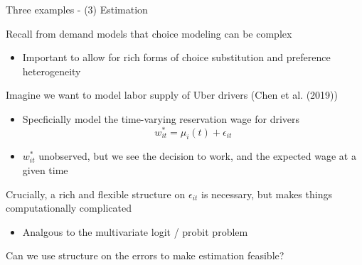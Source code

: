 \documentclass[notes,11pt, aspectratio=169]{beamer}
\newenvironment{wideitemize}{\itemize\addtolength{\itemsep}{10pt}}{\enditemize}
\begin{document}
\begin{frame}{Three examples - (3) Estimation}
  \begin{wideitemize}
  \item Recall from demand models that choice modeling can be complex
    \begin{itemize}
    \item Important to allow for rich forms of choice substitution and
      preference heterogeneity
    \end{itemize}
  \item Imagine we want to model labor supply of Uber drivers (Chen et al. (2019))
    \begin{itemize}
    \item Specficially model the time-varying reservation wage for drivers
      $$w_{it}^{*} = \mu_{i}(t) + \epsilon_{it}$$
    \item $w_{it}^{*}$ unobserved, but we see the decision to work,
      and the expected wage at a given time
    \end{itemize}
  \item Crucially, a rich and flexible structure on $\epsilon_{it}$ is necessary, but makes things computationally complicated
    \begin{itemize}
    \item Analgous to the multivariate logit / probit problem
    \end{itemize}
  \item Can we use structure on the errors to make estimation feasible?
  \end{wideitemize}
\end{frame}
\end{document}
